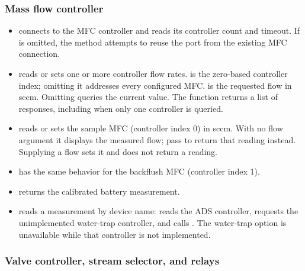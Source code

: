 \subsubsection{Mass flow controller}

\begin{itemize}
    \item {} connects to the MFC controller and
    reads its controller count and timeout. If  is omitted, the
    method attempts to reuse the port from the existing MFC connection.
    \item {} reads or sets one or
    more controller flow rates.  is the zero-based controller
    index; omitting it addresses every configured MFC.  is
    the requested flow in sccm. Omitting  queries the current
    value. The function returns a list of responses, including when only one
    controller is queried.
    \item {} reads or sets the sample
    MFC (controller index 0) in sccm. With no flow argument it displays the
    measured flow; pass  to return that reading instead.
    Supplying a flow sets it and does not return a reading.
    \item {} has the same behavior
    for the backflush MFC (controller index 1).
    \item {} returns the calibrated battery measurement.
    \item {} reads a measurement by device name:
     reads the ADS controller,  requests the
    unimplemented water-trap controller, and  calls
    . The water-trap option is unavailable while that
    controller is not implemented.
\end{itemize}

\subsubsection{Valve controller, stream selector, and relays}

